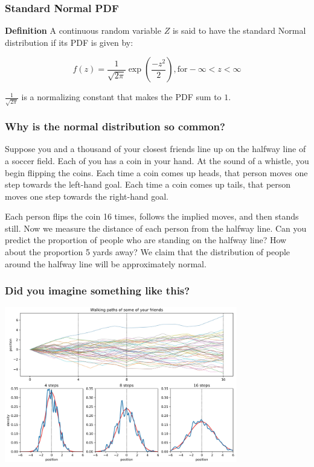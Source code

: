 \documentclass{beamer}
\begin{document}
\begin{frame}
\frametitle{Standard Normal PDF}

\textbf{Definition} A continuous random variable $Z$ is said to have the standard Normal distribution if its PDF is given by:

\bigskip

\begin{equation}
	f(z) = \frac{1}{\sqrt{2 \pi}} \exp \left(\frac{-z^{2}}{2} \right), \textrm{for} -\infty < z < \infty
\end{equation}

\bigskip

$\frac{1}{\sqrt{2\pi}}$ is a normalizing constant that makes the PDF sum to $1$.

\end{frame}


\begin{frame}
\frametitle{Why is the normal distribution so common?}

Suppose you and a thousand of your closest friends line up on the halfway line of a soccer field. Each of you has a coin in your hand. At the sound of a whistle, you begin flipping the coins. Each time a coin comes up heads, that person moves one step towards the left-hand goal. Each time a coin comes up tails, that person moves one step towards the right-hand goal.

\bigskip

Each person flips the coin 16 times, follows the implied moves, and then stands still. Now we measure the distance of each person from the halfway line. Can you predict the proportion of people who are standing on the halfway line? How about the proportion 5 yards away? We claim that the distribution of people around the halfway line will be approximately normal.

\end{frame}


\begin{frame}
\frametitle{Did you imagine something like this?}

\begin{center}
\includegraphics[width=4in]{random_walkers.jpg}
\end{center}

\end{frame}
\end{document}
